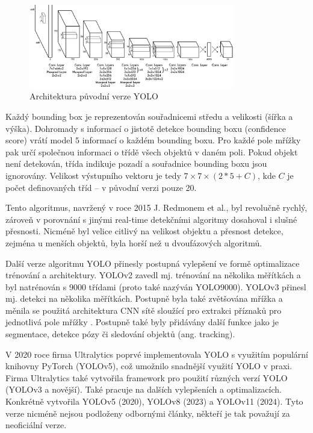 \begin{figure}[]
    \centering
    \includegraphics[width=0.8\textwidth]{Figures/yolo}
    \caption{Architektura původní verze YOLO \cite{yolo}}
    \label{fig:yolo}
\end{figure}

Každý bounding box je reprezentován souřadnicemi středu a velikosti (šířka a
výška). Dohromady s informací o jistotě detekce bounding boxu (confidence
score) vrátí model $5$ informací o každém bounding boxu. Pro každé pole mřížky
pak určí společnou informaci o třídě všech objektů v daném poli. Pokud objekt
není detekován, třída indikuje pozadí a souřadnice bounding boxu jsou
ignorovány. Velikost výstupního vektoru je tedy $7 \times 7 \times (2 * 5 +
    C)$, kde $C$ je počet definovaných tříd – v původní verzi pouze 20.

Tento algoritmus, navržený v roce 2015 J. Redmonem et al., byl revolučně
rychlý, zároveň v porovnání s jinými real-time detekčními algoritmy dosahoval i
slušné přesnosti. Nicméně byl velice citlivý na velikost objektu a přesnost
detekce, zejména u menších objektů, byla horší než u dvoufázových algoritmů.

Další verze algoritmu YOLO přinesly postupná vylepšení ve formě optimalizace
trénování a architektury. YOLOv2 \cite{yolo9000} zavedl mj. trénování na
několika měřítkách a byl natrénován s 9000 třídami (proto také nazýván
YOLO9000). YOLOv3 \cite{yolov3} přinesl mj. detekci na několika měřítkách.
Postupně byla také zvětšována mřížka a měnila se použitá architektura CNN sítě
sloužící pro extrakci příznaků pro jednotlivá pole mřížky \cite{yoloversions}.
Postupně také byly přidávány další funkce jako je segmentace, detekce pózy či
sledování objektů (ang. tracking).

V 2020 roce firma Ultralytics poprvé implementovala YOLO s využitím populární
knihovny PyTorch (YOLOv5), což umožnilo snadnější využití YOLO v praxi. Firma
Ultralytics také vytvořila framework pro použití různých verzí YOLO (YOLOv3 a
novější). Také pracuje na dalších vylepšeních a optimalizacích. Konkrétně
vytvořila YOLOv5 (2020), YOLOv8 (2023) a YOLOv11 (2024). Tyto verze nicméně
nejsou podloženy odbornými články, někteří je tak považují za neoficiální
verze.

